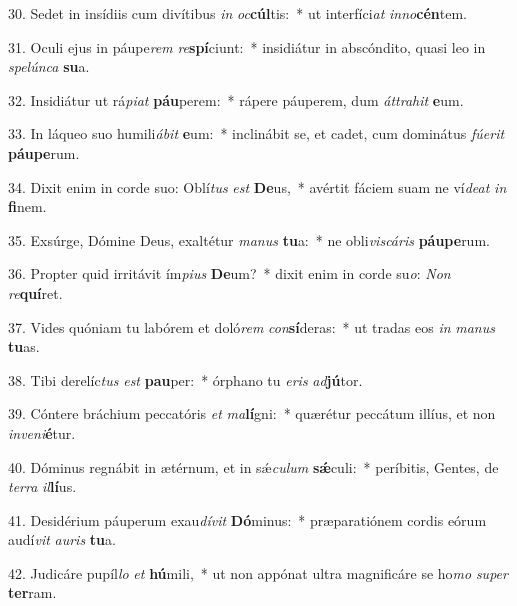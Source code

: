 30. Sedet in insídiis cum divítibus \textit{in} \textit{oc}\textbf{cúl}tis:~*  ut interfíci\textit{at} \textit{in}\textit{no}\textbf{cén}tem.\

31. Oculi ejus in páupe\textit{rem} \textit{re}\textbf{spí}ciunt:~*  insidiátur in abscóndito, quasi leo in \textit{spe}\textit{lún}\textit{ca} \textbf{su}a.\

32. Insidiátur ut rá\textit{pi}\textit{at} \textbf{páu}perem:~*  rápere páuperem, dum \textit{át}\textit{tra}\textit{hit} \textbf{e}um.\

33. In láqueo suo humili\textit{á}\textit{bit} \textbf{e}um:~*  inclinábit se, et cadet, cum dominátus \textit{fú}\textit{e}\textit{rit} \textbf{páu}\textbf{pe}rum.\

34. Dixit enim in corde suo: Oblí\textit{tus} \textit{est} \textbf{De}us,~*  avértit fáciem suam ne ví\textit{de}\textit{at} \textit{in} \textbf{fi}nem.\

35. Exsúrge, Dómine Deus, exaltétur \textit{ma}\textit{nus} \textbf{tu}a:~*  ne obli\textit{vis}\textit{cá}\textit{ris} \textbf{páu}\textbf{pe}rum.\

36. Propter quid irritávit ím\textit{pi}\textit{us} \textbf{De}um?~*  dixit enim in corde su\textit{o}: \textit{Non} \textit{re}\textbf{quí}ret.\

37. Vides quóniam tu labórem et doló\textit{rem} \textit{con}\textbf{sí}deras:~*  ut tradas eos \textit{in} \textit{ma}\textit{nus} \textbf{tu}as.\

38. Tibi derelíc\textit{tus} \textit{est} \textbf{pau}per:~*  órphano tu \textit{e}\textit{ris} \textit{ad}\textbf{jú}tor.\

39. Cóntere bráchium peccatóris \textit{et} \textit{ma}\textbf{lí}gni:~*  quærétur peccátum illíus, et non \textit{in}\textit{ve}\textit{ni}\textbf{é}tur.\

40. Dóminus regnábit in ætérnum, et in sǽ\textit{cu}\textit{lum} \textbf{sǽ}culi:~*  períbitis, Gentes, de \textit{ter}\textit{ra} \textit{il}\textbf{lí}us.\

41. Desidérium páuperum exau\textit{dí}\textit{vit} \textbf{Dó}minus:~*  præparatiónem cordis eórum audí\textit{vit} \textit{au}\textit{ris} \textbf{tu}a.\

42. Judicáre pupíl\textit{lo} \textit{et} \textbf{hú}mili,~*  ut non appónat ultra magnificáre se ho\textit{mo} \textit{su}\textit{per} \textbf{ter}ram.\

